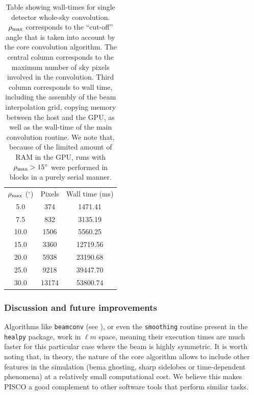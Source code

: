 \documentclass[a4paper,11pt]{article}
\begin{document}
\begin{table}[]
	\centering
	\begin{tabular}{ccc}
		$\rho_{\rm{max}}$ (${}^\circ$) & Pixels & Wall time (ms) \\
		5.0 & 374 & 1471.41 \\
		7.5 & 832 & 3135.19 \\
		10.0 & 1506 & 5560.25 \\
		15.0 & 3360 & 12719.56 \\
		20.0 & 5938 & 23190.68 \\
		25.0 & 9218 & 39447.70 \\
		30.0 & 13174 & 53800.74
	\end{tabular}
	\caption{Table showing wall-times for single detector whole-sky convolution. $\rho_{\rm{max}}$ corresponds to the ``cut-off'' angle that is taken into account by the core convolution algorithm. The central column corresponds to the maximum number of sky pixels involved in the convolution. Third column corresponds to wall time, including the assembly of the beam interpolation grid, copying memory between the host and the GPU, as well as the wall-time of the main convolution routine. We note that, because of the limited amount of RAM in the GPU, runs with $\rho_{\rm{max}} > 15^\circ$ were performed in blocks in a purely serial manner.}
	\label{tab::performance}
\end{table}

\subsubsection{Discussion and future improvements}

Algorithms like \texttt{beamconv} (see \cite{2018arXiv180905034D}), or even the \texttt{smoothing} routine present in the \texttt{healpy} package, work in $\ell m$ space, meaning their execution times are much faster for this particular case where the beam is highly symmetric. It is worth noting that, in theory, the nature of the core algorithm allows to include other features in the simulation (bema ghosting, sharp sidelobes or time-dependent phenomena) at a relatively small computational cost. We believe this makes PISCO a good complement to other software tools that perform similar tasks.
\end{document}
